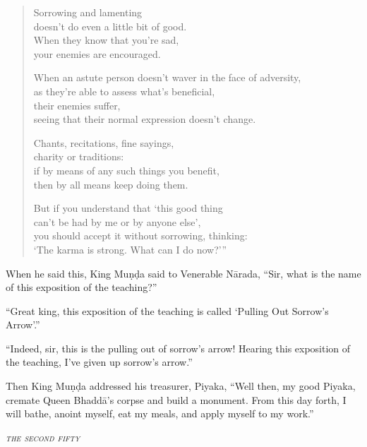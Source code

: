 \documentclass[12pt,openany]{book}%
\let\oldcontentsline\contentsline
\newcommand{\nopagecontentsline}[3]{\oldcontentsline{#1}{#2}{}}
\newcommand*{\pannasa}[1]{\clearpage\thispagestyle{empty}\begin{center}\vspace*{14em}\setstretch{.85}\huge\itshape\scshape\MakeLowercase{#1}\end{center}}
\begin{document}
\begin{verse}%
Sorrowing and lamenting \\
doesn’t do even a little bit of good. \\
When they know that you’re sad, \\
your enemies are encouraged. 

When an astute person doesn’t waver in the face of adversity, \\
as they’re able to assess what’s beneficial, \\
their enemies suffer, \\
seeing that their normal expression doesn’t change. 

Chants, recitations, fine sayings, \\
charity or traditions: \\
if by means of any such things you benefit, \\
then by all means keep doing them. 

But if you understand that ‘this good thing \\
can’t be had by me or by anyone else’, \\
you should accept it without sorrowing, thinking: \\
‘The karma is strong. What can I do now?’” 

%
\end{verse}

When he said this, King \textsanskrit{Muṇḍa} said to Venerable \textsanskrit{Nārada}, “Sir, what is the name of this exposition of the teaching?” 

“Great king, this exposition of the teaching is called ‘Pulling Out Sorrow’s Arrow’.” 

“Indeed, sir, this is the pulling out of sorrow’s arrow! Hearing this exposition of the teaching, I’ve given up sorrow’s arrow.” 

Then King \textsanskrit{Muṇḍa} addressed his treasurer, Piyaka, “Well then, my good Piyaka, cremate Queen \textsanskrit{Bhaddā}’s corpse and build a monument. From this day forth, I will bathe, anoint myself, eat my meals, and apply myself to my work.” 

%
\pannasa{The Second Fifty }
\markboth{}{}
\addtocontents{toc}{\let\protect\contentsline\protect\oldcontentsline}
\end{document}

